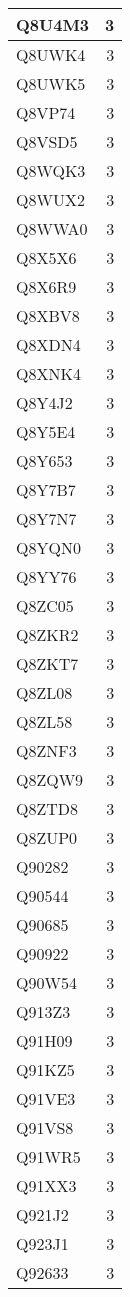 \documentclass[
]{book}
\theoremstyle{definition}
\theoremstyle{definition}
\theoremstyle{definition}
\theoremstyle{definition}
\theoremstyle{remark}
\begin{document}
\begin{table}
\begin{tabular}{l|r}
\hline
Q8U4M3 & 3\\
\hline
Q8UWK4 & 3\\
\hline
Q8UWK5 & 3\\
\hline
Q8VP74 & 3\\
\hline
Q8VSD5 & 3\\
\hline
Q8WQK3 & 3\\
\hline
Q8WUX2 & 3\\
\hline
Q8WWA0 & 3\\
\hline
Q8X5X6 & 3\\
\hline
Q8X6R9 & 3\\
\hline
Q8XBV8 & 3\\
\hline
Q8XDN4 & 3\\
\hline
Q8XNK4 & 3\\
\hline
Q8Y4J2 & 3\\
\hline
Q8Y5E4 & 3\\
\hline
Q8Y653 & 3\\
\hline
Q8Y7B7 & 3\\
\hline
Q8Y7N7 & 3\\
\hline
Q8YQN0 & 3\\
\hline
Q8YY76 & 3\\
\hline
Q8ZC05 & 3\\
\hline
Q8ZKR2 & 3\\
\hline
Q8ZKT7 & 3\\
\hline
Q8ZL08 & 3\\
\hline
Q8ZL58 & 3\\
\hline
Q8ZNF3 & 3\\
\hline
Q8ZQW9 & 3\\
\hline
Q8ZTD8 & 3\\
\hline
Q8ZUP0 & 3\\
\hline
Q90282 & 3\\
\hline
Q90544 & 3\\
\hline
Q90685 & 3\\
\hline
Q90922 & 3\\
\hline
Q90W54 & 3\\
\hline
Q913Z3 & 3\\
\hline
Q91H09 & 3\\
\hline
Q91KZ5 & 3\\
\hline
Q91VE3 & 3\\
\hline
Q91VS8 & 3\\
\hline
Q91WR5 & 3\\
\hline
Q91XX3 & 3\\
\hline
Q921J2 & 3\\
\hline
Q923J1 & 3\\
\hline
Q92633 & 3\\

\end{tabular}
\end{table}
\end{document}
